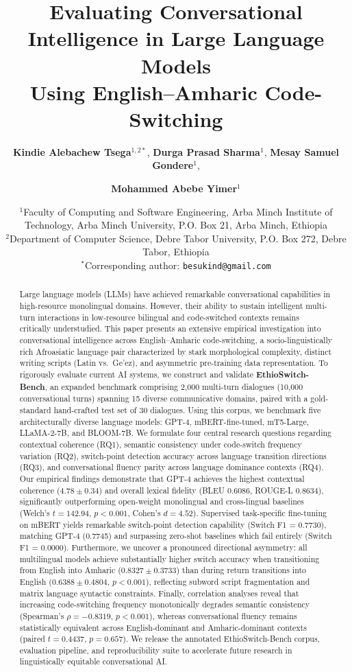 \documentclass[11pt,a4paper]{article}
\title{\textbf{\Large Evaluating Conversational Intelligence in Large Language Models\\Using English--Amharic Code-Switching}}
\author{
    \textbf{Kindie Alebachew Tsega}$^{1,2*}$, 
    \textbf{Durga Prasad Sharma}$^{1}$, 
    \textbf{Mesay Samuel Gondere}$^{1}$, \and
    \textbf{Mohammed Abebe Yimer}$^{1}$
}
\date{
    \small
    $^{1}$Faculty of Computing and Software Engineering, Arba Minch Institute of Technology, Arba Minch University, P.O. Box 21, Arba Minch, Ethiopia\\
    $^{2}$Department of Computer Science, Debre Tabor University, P.O. Box 272, Debre Tabor, Ethiopia\\[1ex]
    $^{*}$Corresponding author: \texttt{besukind@gmail.com}
}
\begin{document}
\maketitle

\begin{abstract}
Large language models (LLMs) have achieved remarkable conversational capabilities in high-resource monolingual domains. However, their ability to sustain intelligent multi-turn interactions in low-resource bilingual and code-switched contexts remains critically understudied. This paper presents an extensive empirical investigation into conversational intelligence across English--Amharic code-switching, a socio-linguistically rich Afroasiatic language pair characterized by stark morphological complexity, distinct writing scripts (Latin vs.\ Ge'ez), and asymmetric pre-training data representation. To rigorously evaluate current AI systems, we construct and validate \textbf{EthioSwitch-Bench}, an expanded benchmark comprising 2,000 multi-turn dialogues (10,000 conversational turns) spanning 15 diverse communicative domains, paired with a gold-standard hand-crafted test set of 30 dialogues. Using this corpus, we benchmark five architecturally diverse language models: GPT-4, mBERT-fine-tuned, mT5-Large, LLaMA-2-7B, and BLOOM-7B. We formulate four central research questions regarding contextual coherence (RQ1), semantic consistency under code-switch frequency variation (RQ2), switch-point detection accuracy across language transition directions (RQ3), and conversational fluency parity across language dominance contexts (RQ4). Our empirical findings demonstrate that GPT-4 achieves the highest contextual coherence ($4.78 \pm 0.34$) and overall lexical fidelity (BLEU 0.6086, ROUGE-L 0.8634), significantly outperforming open-weight monolingual and cross-lingual baselines (Welch's $t = 142.94$, $p < 0.001$, Cohen's $d = 4.52$). Supervised task-specific fine-tuning on mBERT yields remarkable switch-point detection capability (Switch F1 = 0.7730), matching GPT-4 (0.7745) and surpassing zero-shot baselines which fail entirely (Switch F1 = 0.0000). Furthermore, we uncover a pronounced directional asymmetry: all multilingual models achieve substantially higher switch accuracy when transitioning from English into Amharic ($0.8327 \pm 0.3733$) than during return transitions into English ($0.6388 \pm 0.4804$, $p < 0.001$), reflecting subword script fragmentation and matrix language syntactic constraints. Finally, correlation analyses reveal that increasing code-switching frequency monotonically degrades semantic consistency (Spearman's $\rho = -0.8319$, $p < 0.001$), whereas conversational fluency remains statistically equivalent across English-dominant and Amharic-dominant contexts (paired $t = 0.4437$, $p = 0.657$). We release the annotated EthioSwitch-Bench corpus, evaluation pipeline, and reproducibility suite to accelerate future research in linguistically equitable conversational AI.
\end{abstract}
\end{document}
